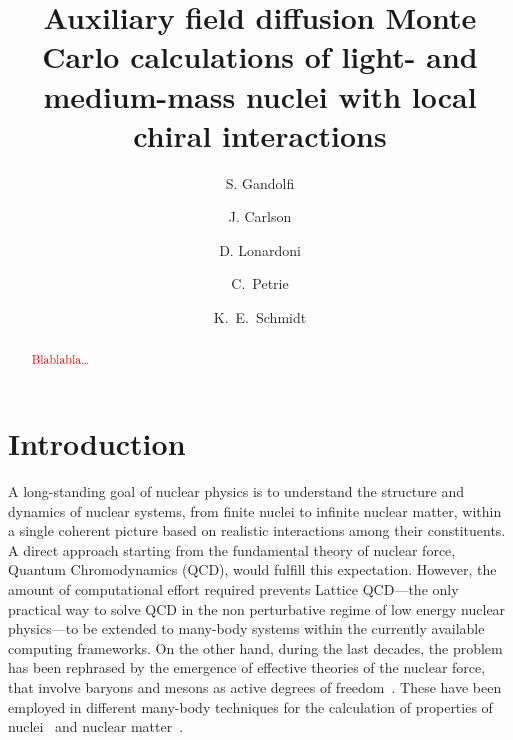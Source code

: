 \documentclass[aps,prc,twocolumn,superscriptaddress,floatfix]{revtex4-1}
\newcommand{\red}[1]{\protect\textcolor{red}{#1}}
\begin{document}
\title{Auxiliary field diffusion Monte Carlo calculations of light- and medium-mass nuclei with local chiral interactions}

\author{S. Gandolfi}
\author{J. Carlson}

\author{D. Lonardoni}

\author{C.~Petrie}
\author{K.~E.~Schmidt}

\begin{abstract}
\red{Blablabla\ldots}
\end{abstract}

\maketitle

\section{Introduction}
\label{sec:intro}
A long-standing goal of nuclear physics is to understand the structure and dynamics 
of nuclear systems, from finite nuclei to infinite nuclear matter, within a single 
coherent picture based on realistic interactions among their constituents.
A direct approach starting from the fundamental theory of nuclear force, Quantum Chromodynamics (QCD), 
would fulfill this expectation. However, the amount of computational effort required prevents 
Lattice QCD---the only practical way to solve QCD in the non perturbative regime of low energy 
nuclear physics---to be extended to many-body systems within the currently available computing frameworks.
On the other hand, during the last decades, the problem has been rephrased by the emergence of 
effective theories of the nuclear force, that involve baryons and mesons as active degrees of 
freedom~\cite{Wiringa:1995,Epelbaum:2009,Machleidt:2011,Ekstrom:2013,Gezerlis:2014,Entem:2015,
Epelbaum:2015,Ekstrom:2015,Piarulli:2015,Lynn:2016,Ekstrom:2017}. These have been 
employed in different many-body techniques for the calculation of properties of 
nuclei~\cite{Barrett:2013,Hagen:2013,Carlson:2015,Hergert:2015} 
and nuclear matter~\cite{Akmal:1998,Hebeler:2013,Carlson:2015,Hagen:2014}.
\end{document}
